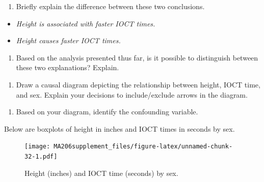 \documentclass[]{book}
\providecommand{\tightlist}{%
  \setlength{\itemsep}{0pt}\setlength{\parskip}{0pt}}
\begin{document}
\vspace{1in}

\begin{enumerate}
\def\labelenumi{\arabic{enumi}.}
\setcounter{enumi}{8}
\tightlist
\item
  Briefly explain the difference between these two conclusions.
\end{enumerate}

\begin{itemize}
\item
  \emph{Height is associated with faster IOCT times.}
\item
  \emph{Height causes faster IOCT times.}
\end{itemize}

\vspace{1in}

\begin{enumerate}
\def\labelenumi{\arabic{enumi}.}
\setcounter{enumi}{9}
\tightlist
\item
  Based on the analysis presented thus far, is it possible to distinguish between these two explanations? Explain.
\end{enumerate}

\vspace{1in}

\begin{enumerate}
\def\labelenumi{\arabic{enumi}.}
\setcounter{enumi}{10}
\tightlist
\item
  Draw a causal diagram depicting the relationship between height, IOCT time, and sex. Explain your decisions to include/exclude arrows in the diagram.
\end{enumerate}

\vspace{1in}

\begin{enumerate}
\def\labelenumi{\arabic{enumi}.}
\setcounter{enumi}{11}
\tightlist
\item
  Based on your diagram, identify the confounding variable.
\end{enumerate}

\vspace{0.5in}

Below are boxplots of height in inches and IOCT times in seconds by sex.

\begin{figure}
\centering
\texttt{[image: MA206supplement\_files/figure-latex/unnamed-chunk-32-1.pdf]}
\caption{\label{fig:unnamed-chunk-32}Height (inches) and IOCT time (seconds) by sex.}
\end{figure}
\end{document}
